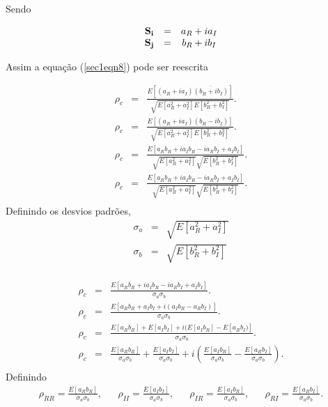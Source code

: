 \documentclass[12pt,a4paper]{article}
\begin{document}
Sendo 

\begin{equation}\label{sec1eqn11}
\begin{array}{ccc}
     {\bf S_i}	&=&a_{R}+ia_{I} \\
     {\bf S_j}  &=&b_{R}+ib_{I} \\
\end{array}
\end{equation}

Assim a equação (\ref{sec1eqn8}) pode ser reescrita

\begin{equation}\label{sec1eqn12}
\begin{array}{ccc}
	\rho_c&=&\frac{E[(a_{R}+ia_{I})\overline{(b_{R}+ib_{I})}]}{\sqrt{E[a_{R}^2+a_{I}^2]E[b_{R}^2+b_{I}^2]}}. \\
	\rho_c&=&\frac{E[(a_{R}+ia_{I})(b_{R}-ib_{I})]}{\sqrt{E[a_{R}^2+a_{I}^2]E[b_{R}^2+b_{I}^2]}}. \\
	\rho_c&=&\frac{E[a_{R}b_{R}+ia_{I}b_{R}-ia_{R}b_{I}+a_{I}b_{I}]}{\sqrt{E[a_{R}^2+a_{I}^2]}\sqrt{E[b_{R}^2+b_{I}^2]}}. \\
	\rho_c&=&\frac{E[a_{R}b_{R}+ia_{I}b_{R}-ia_{R}b_{I}+a_{I}b_{I}]}{\sqrt{E[a_{R}^2+a_{I}^2]}\sqrt{E[b_{R}^2+b_{I}^2]}}. \\
\end{array}
\end{equation}
Definindo os desvios padrões,
\begin{equation}\label{sec1eqn13}
\begin{array}{ccc}
	\sigma_{a}	&=&\sqrt{E[a_{R}^2+a_{I}^2]} \\
	\sigma_{b}      &=&\sqrt{E[b_{R}^2+b_{I}^2]} \\
\end{array}
\end{equation}

\begin{equation}\label{sec1eqn14}
\begin{array}{ccc}
	\rho_c&=&\frac{E[a_{R}b_{R}+ia_{I}b_{R}-ia_{R}b_{I}+a_{I}b_{I}]}{\sigma_a\sigma_b}. \\
	\rho_c&=&\frac{E[a_{R}b_{R}+a_{I}b_{I}+i(a_{I}b_{R}-a_{R}b_{I})]}{\sigma_a\sigma_b}. \\
	\rho_c&=&\frac{E[a_{R}b_{R}]+E[a_{I}b_{I}]+i(E[a_{I}b_{R}]-E[a_{R}b_{I})]}{\sigma_a\sigma_b}. \\
	\rho_c&=&\frac{E[a_{R}b_{R}]}{\sigma_a\sigma_b}+\frac{E[a_{I}b_{I}]}{\sigma_a\sigma_b}+i\left(\frac{E[a_{I}b_{R}]}{\sigma_a\sigma_b}-\frac{E[a_{R}b_{I}]}{\sigma_a\sigma_b}\right). \\
\end{array}
\end{equation}
Definindo
\begin{equation}\label{sec1eqn15}
\begin{array}{ccccccccc}
	\rho_{RR}=\frac{E[a_{R}b_{R}]}{\sigma_a\sigma_b},&&\rho_{II}=\frac{E[a_{I}b_{I}]}{\sigma_a\sigma_b},&&\rho_{IR}=\frac{E[a_{I}b_{R}]}{\sigma_a\sigma_b},&&\rho_{RI}=\frac{E[a_{R}b_{I}]}{\sigma_a\sigma_b}. \\
\end{array}
\end{equation}
\end{document}
